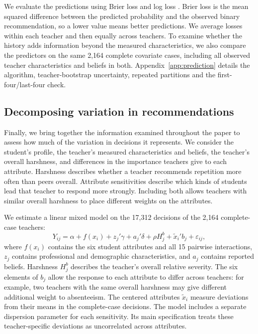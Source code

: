 We evaluate the predictions using Brier loss and log loss \citep{gneiting}. Brier loss is the mean squared difference between the predicted probability and the observed binary recommendation, so a lower value means better predictions. We average losses within each teacher and then equally across teachers. To examine whether the history adds information beyond the measured characteristics, we also compare the predictors on the same 2,164 complete covariate cases, including all observed teacher characteristics and beliefs in both. Appendix~\ref{app:prediction} details the algorithm, teacher-bootstrap uncertainty, repeated partitions and the first-four/last-four check.

\subsection{Decomposing variation in recommendations}
Finally, we bring together the information examined throughout the paper to assess how much of the variation in decisions it represents. We consider the student's profile, the teacher's measured characteristics and beliefs, the teacher's overall harshness, and differences in the importance teachers give to each attribute. Harshness describes whether a teacher recommends repetition more often than peers overall. Attribute sensitivities describe which kinds of students lead that teacher to respond more strongly. Including both allows teachers with similar overall harshness to place different weights on the attributes.

We estimate a linear mixed model on the 17,312 decisions of the 2,164 complete-case teachers:
\begin{equation}
Y_{ij}=\alpha+f(x_i)+z_j'\gamma+a_j'\delta+\rho H^b_j+
\widetilde{x}_i'b_j+\varepsilon_{ij},
\label{eq:decomposition}
\end{equation}
where $f(x_i)$ contains the six student attributes and all 15 pairwise interactions, $z_j$ contains professional and demographic characteristics, and $a_j$ contains reported beliefs. Harshness $H^b_j$ describes the teacher's overall relative severity. The six elements of $b_j$ allow the response to each attribute to differ across teachers: for example, two teachers with the same overall harshness may give different additional weight to absenteeism. The centered attributes $\widetilde{x}_i$ measure deviations from their means in the complete-case decisions. The model includes a separate dispersion parameter for each sensitivity. Its main specification treats these teacher-specific deviations as uncorrelated across attributes.

